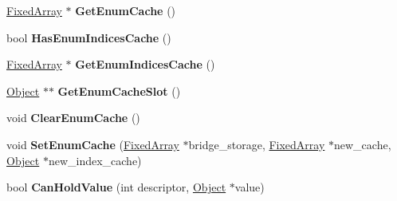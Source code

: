 \begin{DoxyCompactItemize}
\item 
\hypertarget{classv8_1_1internal_1_1_descriptor_array_a6c870120c0438ddd3b90026bf8aa6b6f}{}\hyperlink{classv8_1_1internal_1_1_fixed_array}{Fixed\+Array} $\ast$ {\bfseries Get\+Enum\+Cache} ()\label{classv8_1_1internal_1_1_descriptor_array_a6c870120c0438ddd3b90026bf8aa6b6f}

\item 
\hypertarget{classv8_1_1internal_1_1_descriptor_array_abf06e6c9fa4b566644d6b1e1ee754c75}{}bool {\bfseries Has\+Enum\+Indices\+Cache} ()\label{classv8_1_1internal_1_1_descriptor_array_abf06e6c9fa4b566644d6b1e1ee754c75}

\item 
\hypertarget{classv8_1_1internal_1_1_descriptor_array_aedd217bdb207205e21bf5db4f8b09b7e}{}\hyperlink{classv8_1_1internal_1_1_fixed_array}{Fixed\+Array} $\ast$ {\bfseries Get\+Enum\+Indices\+Cache} ()\label{classv8_1_1internal_1_1_descriptor_array_aedd217bdb207205e21bf5db4f8b09b7e}

\item 
\hypertarget{classv8_1_1internal_1_1_descriptor_array_af4e7f7ccbf7d9f2d70ab81a37f1eae4e}{}\hyperlink{classv8_1_1internal_1_1_object}{Object} $\ast$$\ast$ {\bfseries Get\+Enum\+Cache\+Slot} ()\label{classv8_1_1internal_1_1_descriptor_array_af4e7f7ccbf7d9f2d70ab81a37f1eae4e}

\item 
\hypertarget{classv8_1_1internal_1_1_descriptor_array_aa8edc28abe70c5fe3050e6b87593e0d0}{}void {\bfseries Clear\+Enum\+Cache} ()\label{classv8_1_1internal_1_1_descriptor_array_aa8edc28abe70c5fe3050e6b87593e0d0}

\item 
\hypertarget{classv8_1_1internal_1_1_descriptor_array_a1fc5efb543349c3fac835c0615da88d0}{}void {\bfseries Set\+Enum\+Cache} (\hyperlink{classv8_1_1internal_1_1_fixed_array}{Fixed\+Array} $\ast$bridge\+\_\+storage, \hyperlink{classv8_1_1internal_1_1_fixed_array}{Fixed\+Array} $\ast$new\+\_\+cache, \hyperlink{classv8_1_1internal_1_1_object}{Object} $\ast$new\+\_\+index\+\_\+cache)\label{classv8_1_1internal_1_1_descriptor_array_a1fc5efb543349c3fac835c0615da88d0}

\item 
\hypertarget{classv8_1_1internal_1_1_descriptor_array_a6dbb0ac328db19938d6904df564f4a6a}{}bool {\bfseries Can\+Hold\+Value} (int descriptor, \hyperlink{classv8_1_1internal_1_1_object}{Object} $\ast$value)\label{classv8_1_1internal_1_1_descriptor_array_a6dbb0ac328db19938d6904df564f4a6a}


\end{DoxyCompactItemize}
